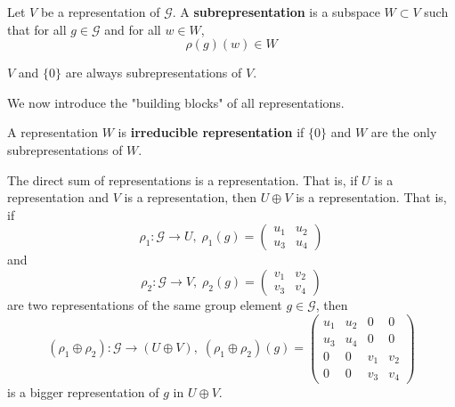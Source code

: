   \begin{definition}[Subrepresentation]
    \label{def:subrepresentation}
    Let $V$ be a representation of $\mathcal{G}$. A \textbf{subrepresentation} is a subspace $W \subset V$ such that for all $g \in \mathcal{G}$ and for all $w \in W$, 
    \begin{equation}
      \rho(g)(w) \in W
    \end{equation}
  \end{definition}

  \begin{example}
    \label{ex:trivial-subrepresentations}
    $V$ and $\{0\}$ are always subrepresentations of $V$. 
  \end{example}

  We now introduce the "building blocks" of all representations. 
  \begin{definition}
    \label{def:irreducible-representation}
    A representation $W$ is \textbf{irreducible representation} if $\{0\}$ and $W$ are the only subrepresentations of $W$. 
  \end{definition}

  \begin{definition}
    \label{def:direct-sum-of-representations}
    The direct sum of representations is a representation. That is, if $U$ is a representation and $V$ is a representation, then $U \oplus V$ is a representation. That is, if 
    \begin{equation}
      \rho_1: \mathcal{G} \rightarrow U, \; \rho_1 (g) = \begin{pmatrix}
      u_1&u_2\\u_3&u_4
      \end{pmatrix}
    \end{equation}
    and
    \begin{equation}
      \rho_2: \mathcal{G} \rightarrow V, \; \rho_2 (g) = \begin{pmatrix}
      v_1 & v_2 \\ v_3 & v_4
      \end{pmatrix}
    \end{equation}
    are two representations of the same group element $g \in \mathcal{G}$, then 
    \begin{equation}
      (\rho_1 \oplus \rho_2): \mathcal{G} \rightarrow (U \oplus V), \;(\rho_1 \oplus \rho_2) (g) = \begin{pmatrix}
      u_1 & u_2 & 0 & 0 \\
      u_3 & u_4 & 0 & 0 \\
      0 & 0 & v_1 & v_2 \\
      0 & 0 & v_3 & v_4 
      \end{pmatrix}
    \end{equation}
    is a bigger representation of $g$ in $U \oplus V$. 
  \end{definition}

